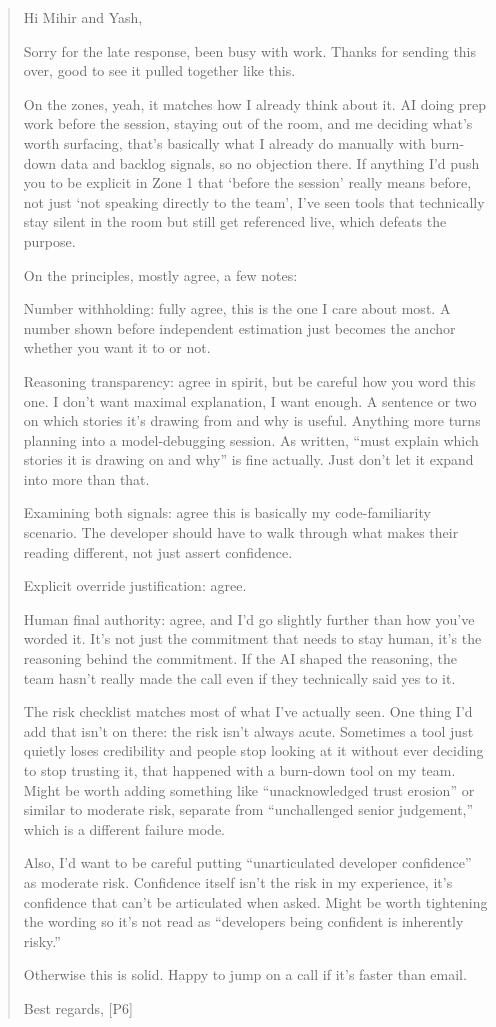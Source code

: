\documentclass[a4paper,twoside]{bth}
\begin{document}
\begin{quote}
Hi Mihir and Yash,

Sorry for the late response, been busy with work. Thanks for sending this over, good to see it pulled together like this.

On the zones, yeah, it matches how I already think about it. AI doing prep work before the session, staying out of the room, and me deciding what's worth surfacing, that's basically what I already do manually with burn-down data and backlog signals, so no objection there. If anything I'd push you to be explicit in Zone 1 that `before the session' really means before, not just `not speaking directly to the team', I've seen tools that technically stay silent in the room but still get referenced live, which defeats the purpose.

On the principles, mostly agree, a few notes:

Number withholding: fully agree, this is the one I care about most. A number shown before independent estimation just becomes the anchor whether you want it to or not.

Reasoning transparency: agree in spirit, but be careful how you word this one. I don't want maximal explanation, I want enough. A sentence or two on which stories it's drawing from and why is useful. Anything more turns planning into a model-debugging session. As written, ``must explain which stories it is drawing on and why'' is fine actually. Just don't let it expand into more than that.

Examining both signals: agree this is basically my code-familiarity scenario. The developer should have to walk through what makes their reading different, not just assert confidence.

Explicit override justification: agree.

Human final authority: agree, and I'd go slightly further than how you've worded it. It's not just the commitment that needs to stay human, it's the reasoning behind the commitment. If the AI shaped the reasoning, the team hasn't really made the call even if they technically said yes to it.

The risk checklist matches most of what I've actually seen. One thing I'd add that isn't on there: the risk isn't always acute. Sometimes a tool just quietly loses credibility and people stop looking at it without ever deciding to stop trusting it, that happened with a burn-down tool on my team. Might be worth adding something like ``unacknowledged trust erosion'' or similar to moderate risk, separate from ``unchallenged senior judgement,'' which is a different failure mode.

Also, I'd want to be careful putting ``unarticulated developer confidence'' as moderate risk. Confidence itself isn't the risk in my experience, it's confidence that can't be articulated when asked. Might be worth tightening the wording so it's not read as ``developers being confident is inherently risky.''

Otherwise this is solid. Happy to jump on a call if it's faster than email.

Best regards,
[P6]
\end{quote}
\end{document}
